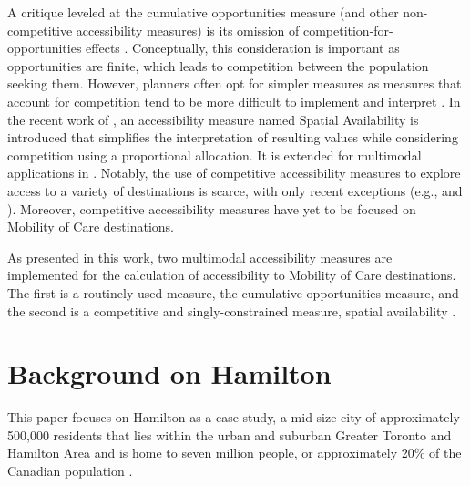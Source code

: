 \documentclass[
  authoryear,
  preprint,
  3p]{elsarticle}
\begin{document}
A critique leveled at the cumulative opportunities measure (and other
non-competitive accessibility measures) is its omission of
competition-for-opportunities effects
\citep{paezDemand2019, soukhovIntroducingSpatialAvailability2023, kelobonyeMeasuringAccessibilitySpatial2020, merlinDoesCompetitionMatter2017}.
Conceptually, this consideration is important as opportunities are
finite, which leads to competition between the population seeking them.
However, planners often opt for simpler measures
\citep{kapatsilaResolvingAccessibilityDilemma2023} as measures that
account for competition tend to be more difficult to implement and
interpret \citep{merlinDoesCompetitionMatter2017}. In the recent work of
\citet{soukhovIntroducingSpatialAvailability2023}, an accessibility
measure named Spatial Availability is introduced that simplifies the
interpretation of resulting values while considering competition using a
proportional allocation. It is extended for multimodal applications in
\citet{soukhovMultimodalSpatialAvailability2024}. Notably, the use of
competitive accessibility measures to explore access to a variety of
destinations is scarce, with only recent exceptions (e.g.,
\citet{kelobonyeMeasuringAccessibilitySpatial2020} and
\citet{singh2022cumulative}). Moreover, competitive accessibility
measures have yet to be focused on Mobility of Care destinations.

As presented in this work, two multimodal accessibility measures are
implemented for the calculation of accessibility to Mobility of Care
destinations. The first is a routinely used measure, the cumulative
opportunities measure, and the second is a competitive and
singly-constrained measure, spatial availability
\citep{soukhovIntroducingSpatialAvailability2023, soukhovMultimodalSpatialAvailability2024}.

\section{Background on Hamilton}\label{background-on-hamilton}

This paper focuses on Hamilton as a case study, a mid-size city of
approximately 500,000 residents that lies within the urban and suburban
Greater Toronto and Hamilton Area and is home to seven million people,
or approximately 20\% of the Canadian population
\citep{cityoftoronto2021CensusPopulationa2022}.
\end{document}
